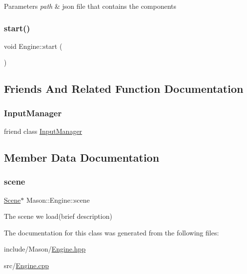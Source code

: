 \begin{DoxyParams}{Parameters}
{\em path} & json file that contains the components \\
\hline
\end{DoxyParams}
\hypertarget{class_mason_1_1_engine_a4d8066dd213a03f5420d1bf60f150ca7}{}\label{class_mason_1_1_engine_a4d8066dd213a03f5420d1bf60f150ca7} 
\subsubsection{\texorpdfstring{start()}{start()}}
{\footnotesize\ttfamily void Engine\+::start (\begin{DoxyParamCaption}{ }\end{DoxyParamCaption})}



\subsection{Friends And Related Function Documentation}
\hypertarget{class_mason_1_1_engine_af0e8c3dcc20b7ddcaf63506363a22821}{}\label{class_mason_1_1_engine_af0e8c3dcc20b7ddcaf63506363a22821} 
\subsubsection{\texorpdfstring{Input\+Manager}{InputManager}}
{\footnotesize\ttfamily friend class \hyperlink{class_mason_1_1_input_manager}{Input\+Manager}\hspace{0.3cm}{\ttfamily [friend]}}



\subsection{Member Data Documentation}
\hypertarget{class_mason_1_1_engine_a2ec6bc225a9327484dde73bb8298ea85}{}\label{class_mason_1_1_engine_a2ec6bc225a9327484dde73bb8298ea85} 
\subsubsection{\texorpdfstring{scene}{scene}}
{\footnotesize\ttfamily \hyperlink{class_mason_1_1_scene}{Scene}$\ast$ Mason\+::\+Engine\+::scene}



The scene we load(brief description) 



The documentation for this class was generated from the following files\+:\begin{DoxyCompactItemize}
\item 
include/\+Mason/\hyperlink{_engine_8hpp}{Engine.\+hpp}\item 
src/\hyperlink{_engine_8cpp}{Engine.\+cpp}\end{DoxyCompactItemize}
